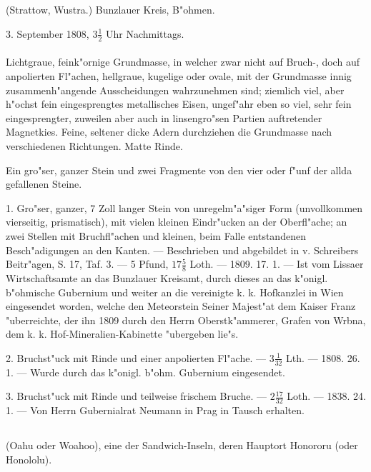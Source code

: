 \documentclass[a4paper, 11pt, oneside, polutonikogreek, german]{article}
\begin{document}
\subsection{}
\begin{center}

(Strattow, Wustra.) Bunzlauer Kreis, B"ohmen.

3. September 1808, $\mathfrak{3\frac{1}{2}}$ Uhr Nachmittags.
\end{center}
\paragraph{}
Lichtgraue, feink"ornige Grundmasse, in welcher zwar nicht auf Bruch-, doch auf anpolierten Fl"achen, hellgraue, kugelige oder ovale, mit der Grundmasse innig zusammenh"angende Ausscheidungen wahrzunehmen sind; ziemlich viel, aber h"ochst fein eingesprengtes metallisches Eisen, ungef"ahr eben so viel, sehr fein eingesprengter, zuweilen aber auch in linsengro"sen Partien auftretender Magnetkies. Feine, seltener dicke Adern durchziehen die Grundmasse nach verschiedenen Richtungen. Matte Rinde.

Ein gro"ser, ganzer Stein und zwei Fragmente von den vier oder f"unf der allda gefallenen Steine.

1. Gro"ser, ganzer, 7 Zoll langer Stein von unregelm"a"siger Form (unvollkommen vierseitig, prismatisch), mit vielen kleinen Eindr"ucken an der Oberfl"ache; an zwei Stellen mit Bruchfl"achen und kleinen, beim Falle entstandenen Besch"adigungen an den Kanten. --- Beschrieben und abgebildet in v. Schreibers Beitr"agen, S. 17, Taf. 3. --- 5 Pfund, $\mathfrak{17\frac{5}{8}}$ Loth. --- 1809. 17. 1. --- Ist vom Lissaer Wirtschaftsamte an das Bunzlauer Kreisamt, durch dieses an das k"onigl. b"ohmische Gubernium und weiter an die vereinigte k. k. Hofkanzlei in Wien eingesendet worden, welche den Meteorstein Seiner Majest"at dem Kaiser Franz "uberreichte, der ihn 1809 durch den Herrn Oberstk"ammerer, Grafen von Wrbna, dem k. k. Hof-Mineralien-Kabinette "ubergeben lie"s.

2. Bruchst"uck mit Rinde und einer anpolierten Fl"ache. --- $\mathfrak{3\frac{1}{32}}$ Lth. --- 1808. 26. 1. --- Wurde durch das k"onigl. b"ohm. Gubernium eingesendet.

3. Bruchst"uck mit Rinde und teilweise frischem Bruche. --- $\mathfrak{2\frac{17}{32}}$ Loth. --- 1838. 24. 1. --- Von Herrn Gubernialrat Neumann in Prag in Tausch erhalten.
\subsection{}
\begin{center}

(Oahu oder Woahoo), eine der Sandwich-Inseln, deren Hauptort Honororu (oder Honololu).
\end{center}
\end{document}
